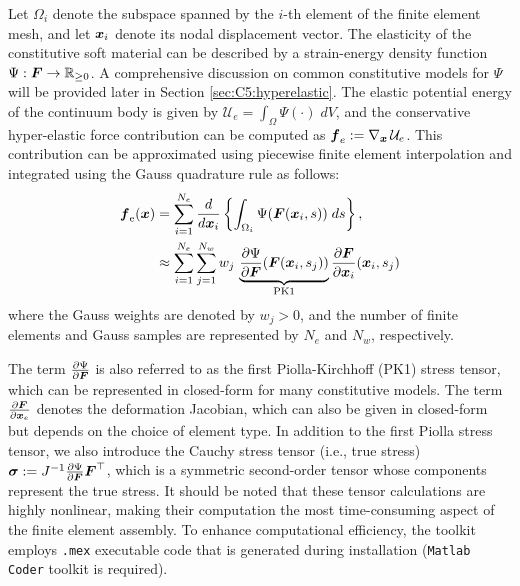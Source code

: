 \begin{intermez}
    
    Let $\Omega_i$ denote the subspace spanned by the $i$-th element of the finite element mesh, and let ${\boldsymbol{x}}_i$ denote its nodal displacement vector. The elasticity of the constitutive soft material can be described by a strain-energy density function $\Psi: {\boldsymbol{F}} \to \mathbb{R}_{\ge 0}$. A comprehensive discussion on common constitutive models for $\Psi$ will be provided later in Section \ref{sec:C5:hyperelastic}. The elastic potential energy of the continuum body is given by $\mathcal{U}_e = \int_\Omega \Psi(\cdot) \; dV$, and the conservative hyper-elastic force contribution can be computed as ${\boldsymbol{f}}_e := \nabla_{{\boldsymbol{x}}}\,\mathcal{U}_e$. This contribution can be approximated using piecewise finite element interpolation and integrated using the Gauss quadrature rule \cite{Kim2018} as follows:
    \begin{align}
        {\boldsymbol{f}}_\textrm{e}({\boldsymbol{x}}) & = \sum_{i=1}^{N_e} \frac{d}{d{\boldsymbol{x}}_i} \left\{\int_{\Omega_i} \Psi({\boldsymbol{F}}({\boldsymbol{x}}_i,s)) \; ds\right\}, \notag                                                    \\
                           & \approx \sum_{i=1}^{N_e} \sum_{j=1}^{N_w} w_j \, \underbrace{\frac{\partial \Psi}{\partial {\boldsymbol{F}}}({\boldsymbol{F}}({\boldsymbol{x}}_i,s_j)) }_{\textrm{PK1}} \frac{\partial {\boldsymbol{F}}}{\partial {\boldsymbol{x}}_i}({\boldsymbol{x}}_i,s_j)
        \label{eq:C5:fem_hyper}
    \end{align}
where the Gauss weights are denoted by $w_j > 0$, and the number of finite elements and Gauss samples are represented by $N_e$ and $N_w$, respectively.

The term $\frac{\partial \Psi}{\partial {\boldsymbol{F}}}$ is also referred to as the first Piolla-Kirchhoff (PK1) stress tensor, which can be represented in closed-form for many constitutive models. The term $\frac{\partial {\boldsymbol{F}}}{\partial {\boldsymbol{x}}_e}$ denotes the deformation Jacobian, which can also be given in closed-form but depends on the choice of element type. In addition to the first Piolla stress tensor, we also introduce the Cauchy stress tensor (i.e., true stress) $\boldsymbol{\sigma} := J^{-1} \frac{\partial \Psi}{\partial {\boldsymbol{F}}} {\boldsymbol{F}}^\top$, which is a symmetric second-order tensor whose components represent the true stress. It should be noted that these tensor calculations are highly nonlinear, making their computation the most time-consuming aspect of the finite element assembly. To enhance computational efficiency, the toolkit employs \texttt{.mex} executable code that is generated during installation (\texttt{Matlab Coder} toolkit is required).
\end{intermez}


